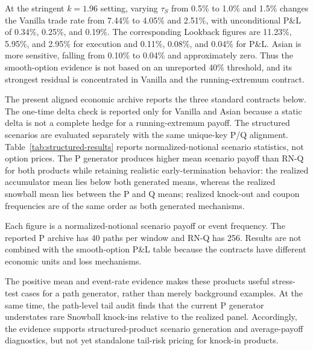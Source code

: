 ﻿\documentclass[12pt,letterpaper]{article}
\newcommand{\tabnote}[1]{\begin{minipage}{\linewidth}\vspace{4pt}\footnotesize\singlespacing #1\end{minipage}}
\begin{document}
At the stringent $k=1.96$ setting, varying $\tau_S$ from 0.5\% to 1.0\% and
1.5\% changes the Vanilla trade rate from 7.44\% to 4.05\% and 2.51\%, with
unconditional P\&L of 0.34\%, 0.25\%, and 0.19\%. The corresponding Lookback
figures are 11.23\%, 5.95\%, and 2.95\% for execution and 0.11\%, 0.08\%, and
0.04\% for P\&L. Asian is more sensitive, falling from 0.10\% to 0.04\% and
approximately zero. Thus the smooth-option evidence is not based on an
unreported 40\% threshold, and its strongest residual is concentrated in
Vanilla and the running-extremum contract.

The present aligned economic archive reports the three standard contracts below.
The one-time delta check is reported only for Vanilla and Asian because a
static delta is not a complete hedge for a running-extremum payoff. The
structured scenarios are evaluated separately with the same unique-key P/Q
alignment. Table~\ref{tab:structured-results} reports normalized-notional
scenario statistics, not option prices. The P generator produces higher mean
scenario payoff than RN-Q for both products while retaining realistic
early-termination behavior: the realized accumulator mean lies below both
generated means, whereas the realized snowball mean lies between the P and Q
means; realized knock-out and coupon frequencies are
of the same order as both generated mechanisms.

\begin{table}[ht]
\singlespacing
\centering
\caption{Aligned structured-product scenario audit on 6{,}824 windows}
\label{tab:structured-results}
\tabnote{Each figure is a normalized-notional scenario payoff or event
frequency. The reported P archive has 40 paths per window and RN-Q has 256.
Results are not combined with
the smooth-option P\&L table because the contracts have different economic
units and loss mechanisms.}
\end{table}

The positive mean and event-rate evidence makes these products useful
stress-test cases for a path generator, rather than merely background
examples. At the same time, the path-level tail audit finds that the current P
generator understates rare Snowball knock-ins relative to the realized panel.
Accordingly, the evidence supports structured-product scenario generation and
average-payoff diagnostics, but not yet standalone tail-risk pricing for
knock-in products.
\end{document}
